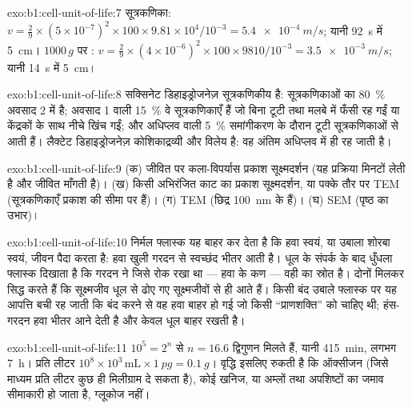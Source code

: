 \begin{solution}{exo:b1:cell-unit-of-life:7}
सूत्रकणिका: $v = \frac{2}{9}\times(5\times 10^{-7})^2\times 100\times
9.81\times 10^4/10^{-3} = \qty{5.4e-4}{m/s}$; यानी \qty{92}{s} में
\qty{5}{cm}। $1000\,g$ पर : $v = \frac{2}{9}\times(4\times
10^{-6})^2\times 100\times 9810/10^{-3} = \qty{3.5e-3}{m/s}$; यानी
\qty{14}{s} में \qty{5}{cm}।
\end{solution}

\begin{solution}{exo:b1:cell-unit-of-life:8}
सक्सिनेट डिहाइड्रोजनेज़ सूत्रकणिकीय है: सूत्रकणिकाओं का \qty{80}{\%}
अवसाद 2 में है; अवसाद 1 वाली \qty{15}{\%} वे सूत्रकणिकाएँ हैं जो बिना
टूटी  तथा मलबे में फँसी रह गईं या केंद्रकों के साथ नीचे खिंच
गईं; और अधिप्लव वाली \qty{5}{\%} समांगीकरण के दौरान टूटी सूत्रकणिकाओं से
आती हैं। लैक्टेट डिहाइड्रोजनेज़ कोशिकाद्रव्यी और विलेय है: वह अंतिम
अधिप्लव में ही रह जाती है।
\end{solution}

\begin{solution}{exo:b1:cell-unit-of-life:9}
(क) जीवित  पर कला-विपर्यास प्रकाश सूक्ष्मदर्शन (यह प्रक्रिया
मिनटों लेती है और जीवित  माँगती है)। (ख) किसी अभिरंजित काट का
प्रकाश सूक्ष्मदर्शन, या पक्के तौर पर TEM (सूत्रकणिकाएँ प्रकाश की सीमा
पर हैं)। (ग) TEM (छिद्र \qty{100}{nm} के हैं)। (घ) SEM (पृष्ठ का उभार)।
\end{solution}

\begin{solution}{exo:b1:cell-unit-of-life:10}
निर्मल फ्लास्क यह बाहर कर देता है कि हवा स्वयं, या उबाला शोरबा स्वयं,
जीवन पैदा करता है: हवा खुली गरदन से स्वच्छंद भीतर आती है। धूल के संपर्क
के बाद धुँधला फ्लास्क दिखाता है कि गरदन ने जिसे रोक रखा था --- हवा के कण
--- वही  का स्रोत है। दोनों मिलकर सिद्ध करते हैं कि सूक्ष्मजीव
धूल से ढोए गए सूक्ष्मजीवों से ही आते हैं। किसी बंद उबाले फ्लास्क पर यह
आपत्ति बची रह जाती कि बंद करने से वह हवा बाहर हो गई जो किसी ``प्राणशक्ति''
को चाहिए थी; हंस-गरदन हवा भीतर आने देती है और केवल धूल बाहर रखती है।
\end{solution}

\begin{solution}{exo:b1:cell-unit-of-life:11}
$10^5 = 2^{n}$ से $n = 16.6$ द्विगुणन मिलते हैं, यानी \qty{415}{min},
लगभग \qty{7}{h}। प्रति लीटर $10^8\times 10^3\,\mathrm{mL}\times\qty{1}{pg} = \qty{0.1}{g}$।
वृद्धि इसलिए रुकती है कि ऑक्सीजन (जिसे माध्यम प्रति लीटर कुछ ही
मिलीग्राम दे सकता है), कोई खनिज, या अम्लों तथा अपशिष्टों का जमाव सीमाकारी
हो जाता है, ग्लूकोज नहीं।
\end{solution}

